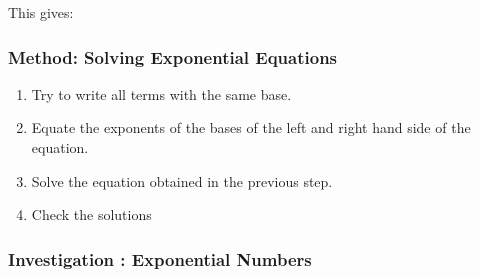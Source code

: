         
        \label{m39253*id155384}This gives:\par 
        \label{m39253*id155389}\nopagebreak\noindent{}
    
        
        \label{m39253*uid65}
            \subsubsection{ Method: Solving Exponential Equations}
            \nopagebreak
            
          
          \label{m39253*eip-925}\begin{enumerate}[noitemsep, label=\textbf{\arabic*}. ] 
            \item Try to write all terms with the same base.\item Equate the exponents of the bases of the left and right hand side of the equation.\item Solve the equation obtained in the previous step.\item Check the solutions\end{enumerate}
        
\label{m39253*secfhsst!!!underscore!!!id3331}
            \subsubsection{  Investigation : Exponential Numbers }
            \nopagebreak
            
